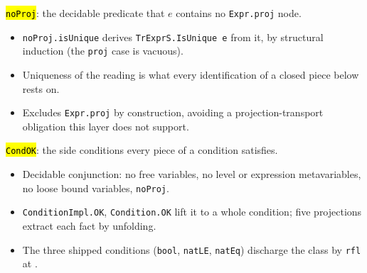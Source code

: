 \begin{definition}
  \label{prim-cond:def:noproj}
  \leanok

   \hl{\texttt{noProj}}: the decidable predicate that $e$ contains no
  \texttt{Expr.proj} node.
  \begin{itemize}
  \item \texttt{noProj.isUnique} derives \texttt{TrExprS.IsUnique e} from it, by structural
    induction (the \texttt{proj} case is vacuous).
  \item Uniqueness of the reading is what every identification of a closed piece below rests on.
  \item {} Excludes \texttt{Expr.proj} by construction, avoiding a projection-transport
    obligation this layer does not support.
  \end{itemize}
\end{definition}

\begin{definition}
  \label{prim-cond:def:condok}
  \leanok

   \hl{\texttt{CondOK}}: the side conditions every piece of a condition satisfies.
  \begin{itemize}
  \item Decidable conjunction: no free variables, no level or expression metavariables, no loose
    bound variables, \texttt{noProj}.
  \item \texttt{ConditionImpl.OK}, \texttt{Condition.OK} lift it to a whole condition; five
    projections extract each fact by unfolding.
  \item The three shipped conditions (\texttt{bool}, \texttt{natLE}, \texttt{natEq}) discharge the
    class by \texttt{rfl} at .
  \end{itemize}
\end{definition}

